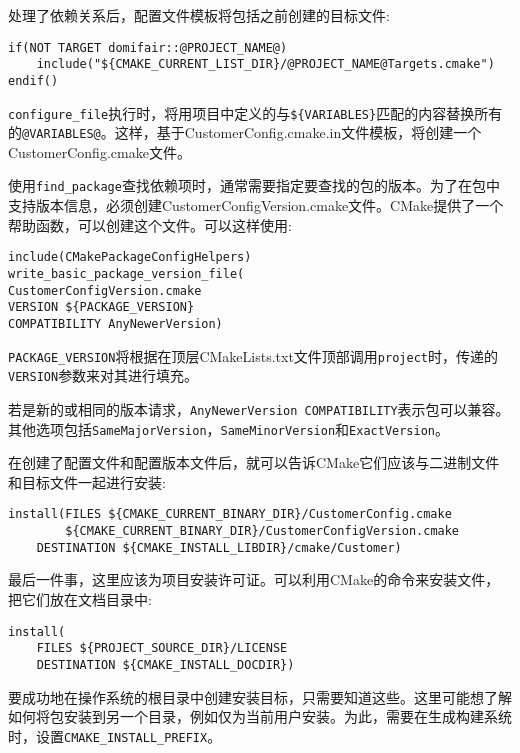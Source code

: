 处理了依赖关系后，配置文件模板将包括之前创建的目标文件:

\begin{lstlisting}[style=styleCMake]
if(NOT TARGET domifair::@PROJECT_NAME@)
	include("${CMAKE_CURRENT_LIST_DIR}/@PROJECT_NAME@Targets.cmake")
endif()
\end{lstlisting}

\texttt{configure\_file}执行时，将用项目中定义的与\texttt{\$\{VARIABLES\}}匹配的内容替换所有的\texttt{@VARIABLES@}。这样，基于CustomerConfig.cmake.in文件模板，将创建一个CustomerConfig.cmake文件。

使用\texttt{find\_package}查找依赖项时，通常需要指定要查找的包的版本。为了在包中支持版本信息，必须创建CustomerConfigVersion.cmake文件。CMake提供了一个帮助函数，可以创建这个文件。可以这样使用:

\begin{lstlisting}[style=styleCMake]
include(CMakePackageConfigHelpers)
write_basic_package_version_file(
CustomerConfigVersion.cmake
VERSION ${PACKAGE_VERSION}
COMPATIBILITY AnyNewerVersion)
\end{lstlisting}

\texttt{PACKAGE\_VERSION}将根据在顶层CMakeLists.txt文件顶部调用\texttt{project}时，传递的\texttt{VERSION}参数来对其进行填充。

若是新的或相同的版本请求，\texttt{AnyNewerVersion COMPATIBILITY}表示包可以兼容。其他选项包括\texttt{SameMajorVersion}，\texttt{SameMinorVersion}和\texttt{ExactVersion}。

在创建了配置文件和配置版本文件后，就可以告诉CMake它们应该与二进制文件和目标文件一起进行安装:

\begin{lstlisting}[style=styleCMake]
install(FILES ${CMAKE_CURRENT_BINARY_DIR}/CustomerConfig.cmake
		${CMAKE_CURRENT_BINARY_DIR}/CustomerConfigVersion.cmake
	DESTINATION ${CMAKE_INSTALL_LIBDIR}/cmake/Customer)
\end{lstlisting}

最后一件事，这里应该为项目安装许可证。可以利用CMake的命令来安装文件，把它们放在文档目录中:

\begin{lstlisting}[style=styleCMake]
install(
	FILES ${PROJECT_SOURCE_DIR}/LICENSE
	DESTINATION ${CMAKE_INSTALL_DOCDIR})
\end{lstlisting}

要成功地在操作系统的根目录中创建安装目标，只需要知道这些。这里可能想了解如何将包安装到另一个目录，例如仅为当前用户安装。为此，需要在生成构建系统时，设置\texttt{CMAKE\_INSTALL\_PREFIX}。

